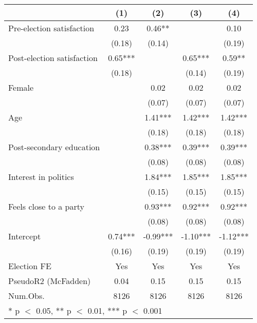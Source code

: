 \begin{table}
\centering
\begin{tabular}[t]{lcccc}
\toprule
  & (1) & (2) & (3) & (4)\\
\midrule
Pre-election satisfaction & 0.23 & 0.46** &  & 0.10\\
 & (0.18) & (0.14) &  & (0.19)\\
Post-election satisfaction & 0.65*** &  & 0.65*** & 0.59**\\
 & (0.18) &  & (0.14) & (0.19)\\
Female &  & 0.02 & 0.02 & 0.02\\
 &  & (0.07) & (0.07) & (0.07)\\
Age &  & 1.41*** & 1.42*** & 1.42***\\
 &  & (0.18) & (0.18) & (0.18)\\
Post-secondary education &  & 0.38*** & 0.39*** & 0.39***\\
 &  & (0.08) & (0.08) & \vphantom{1} (0.08)\\
Interest in politics &  & 1.84*** & 1.85*** & 1.85***\\
 &  & (0.15) & (0.15) & (0.15)\\
Feels close to a party &  & 0.93*** & 0.92*** & 0.92***\\
 &  & (0.08) & (0.08) & (0.08)\\
Intercept & 0.74*** & -0.99*** & -1.10*** & -1.12***\\
 & (0.16) & (0.19) & (0.19) & (0.19)\\
\midrule
Election FE & Yes & Yes & Yes & Yes\\
PseudoR2 (McFadden) & 0.04 & 0.15 & 0.15 & 0.15\\
Num.Obs. & 8126 & 8126 & 8126 & 8126\\
\bottomrule
\multicolumn{5}{l}{\rule{0pt}{1em}* p $<$ 0.05, ** p $<$ 0.01, *** p $<$ 0.001}\\
\end{tabular}
\end{table}
